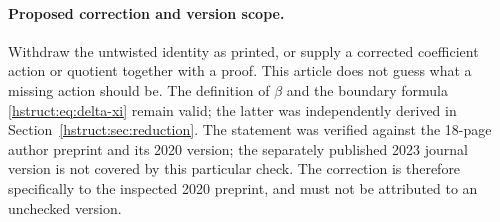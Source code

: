 \paragraph{Proposed correction and version scope.}
Withdraw the untwisted identity as printed, or supply a corrected
coefficient action or quotient together with a proof. This article
does not guess what a missing action should be. The definition of
$\beta$ and the boundary formula \eqref{hstruct:eq:delta-xi} remain valid;
the latter was independently derived in Section~\ref{hstruct:sec:reduction}.
The statement was verified against the 18-page author preprint and
its 2020 version; the separately published 2023 journal version is not
covered by this particular check. The correction is therefore specifically to the inspected
2020 preprint, and must not be attributed to an unchecked version.


